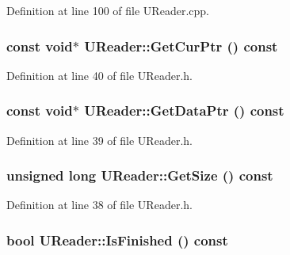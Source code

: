 Definition at line 100 of file UReader.cpp.\hypertarget{class_u_reader_0c4c255c273d4c00b12130cab85511e0}{
\subsubsection[{GetCurPtr}]{\setlength{\rightskip}{0pt plus 5cm}const void$\ast$ UReader::GetCurPtr () const}}
\label{class_u_reader_0c4c255c273d4c00b12130cab85511e0}




Definition at line 40 of file UReader.h.\hypertarget{class_u_reader_7e140c746fd5dc32e30319621659bb25}{
\subsubsection[{GetDataPtr}]{\setlength{\rightskip}{0pt plus 5cm}const void$\ast$ UReader::GetDataPtr () const}}
\label{class_u_reader_7e140c746fd5dc32e30319621659bb25}




Definition at line 39 of file UReader.h.\hypertarget{class_u_reader_09963ca355201dfbfdb1cbaddb12f5af}{
\subsubsection[{GetSize}]{\setlength{\rightskip}{0pt plus 5cm}unsigned long UReader::GetSize () const}}
\label{class_u_reader_09963ca355201dfbfdb1cbaddb12f5af}




Definition at line 38 of file UReader.h.\hypertarget{class_u_reader_82a6582f941b85796993e796222bd759}{
\subsubsection[{IsFinished}]{\setlength{\rightskip}{0pt plus 5cm}bool UReader::IsFinished () const}}
\label{class_u_reader_82a6582f941b85796993e796222bd759}




